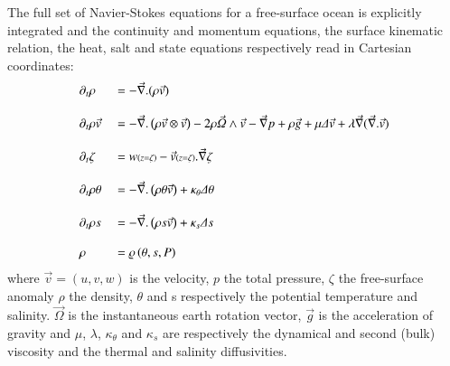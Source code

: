 \documentclass[a4paper,12pt]{article}
\begin{document}
\indent The full set of Navier-Stokes equations for a free-surface ocean is explicitly integrated and the continuity and momentum equations, the surface kinematic relation, the heat, salt and state equations respectively read in Cartesian coordinates: 
\begin{alignat}{2}
  \displaystyle
   &\partial_t\rho &&=-\vec{\nabla}.(\rho\vec{v})\\[3mm]
   \label{momentum}
   &\partial_t\rho\vec{v} &&=
   -\vec{\nabla}.\left(\rho\vec{v}\otimes\vec{v}\right)
   -2\rho\vec{\Omega}\wedge\vec{v}
   -\vec\nabla p+\rho\vec{g}
   +\mu\Delta\vec{v}
   +\lambda\vec{\nabla}(\vec{\nabla}.\vec{v})\\[3mm]
   &\partial_t{\zeta} &&= 
   w\scriptstyle(z=\zeta)\textstyle
   -\vec{v}\scriptstyle(z=\zeta)\textstyle.\vec{\nabla}{\zeta}\\[3mm]
   &\partial_t{\rho\theta} &&=-\vec{\nabla}.\left(\rho\theta\vec{v}\right)
   +\kappa_{\theta}\Delta\theta\\[3mm]
   &\partial_t{\rho s} &&=-\vec{\nabla}.\left(\rho s\vec{v}\right)
   +\kappa_{s}\Delta s\\[3mm]
   &\rho &&=\varrho\left(\theta,s,P\right)
\end{alignat}
where $\vec{v}=(u,v,w)$ is the velocity, $p$ the total pressure, $\zeta$ the free-surface anomaly $\rho$ the density, $\theta$ and s respectively the potential temperature and salinity. $\vec{\Omega}$ is the instantaneous earth rotation vector, $\vec{g}$ is the acceleration of gravity and $\mu$, $\lambda$, $\kappa_{\theta}$ and $\kappa_{s}$ are respectively the dynamical and second (bulk) viscosity and the thermal and salinity diffusivities.

   
\end{document}
